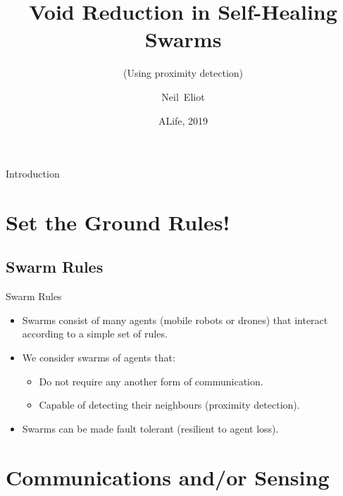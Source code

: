 \documentclass{beamer}
\title{Void Reduction in Self-Healing Swarms}
\subtitle{(Using proximity detection)}
\author{Neil~Eliot\inst{1}}
\institute[Northumbria University] %
{
  \inst{1}
  Department of Computer and Information Sciences\\
  University of Northumbria
}
\date{ALife, 2019}
\begin{document}
\begin{frame}
  \titlepage
\end{frame}

\begin{frame}{Introduction}
  \tableofcontents
\end{frame}

\section{Set the Ground Rules!}

\subsection{Swarm Rules}

\begin{frame}{Swarm Rules}
  \begin{itemize}
  \item {
    Swarms consist of many agents (mobile robots or drones) that interact according to a simple set of rules.
  }
  \item {
    We consider swarms of agents that:
    \begin{itemize}
      \item Do not require any another form of communication. 
      \item Capable of detecting their neighbours (proximity detection). 
    \end{itemize}
  }
  \item {
    Swarms can be made fault tolerant (resilient to agent loss).
  }
  \end{itemize}
\end{frame}

\section{Communications and/or Sensing}
\end{document}
